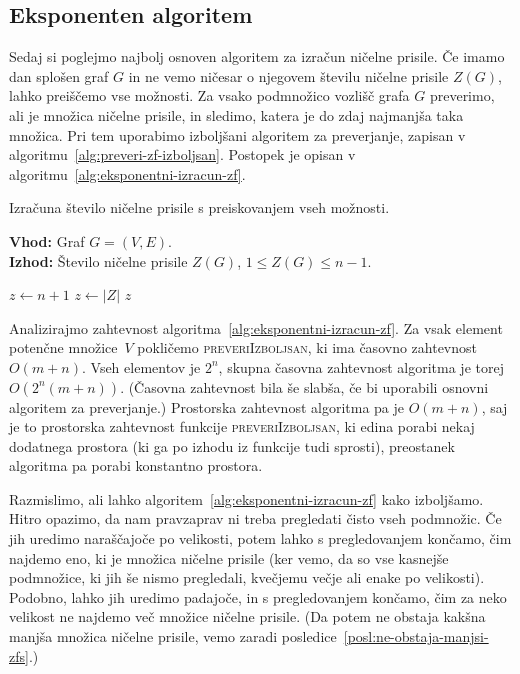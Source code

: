 \documentclass[12pt,a4paper,twoside]{article}
\theoremstyle{definition} %
\theoremstyle{plain} %
\numberwithin{equation}{section}  %
\begin{document}
\subsection{Eksponenten algoritem}
Sedaj si poglejmo najbolj osnoven algoritem za izračun ničelne prisile. Če imamo dan splošen graf $G$ in ne vemo ničesar o njegovem številu ničelne prisile $Z(G)$, lahko preiščemo vse možnosti. Za vsako podmnožico vozlišč grafa $G$ preverimo, ali je množica ničelne prisile, in sledimo, katera je do zdaj najmanjša taka množica. Pri tem uporabimo izboljšani algoritem za preverjanje, zapisan v algoritmu~\ref{alg:preveri-zf-izboljsan}. Postopek je opisan v algoritmu~\ref{alg:eksponentni-izracun-zf}.
\begin{algorithm}[!h]
    \caption{Izračuna število ničelne prisile s preiskovanjem vseh možnosti.}
    \label{alg:eksponentni-izracun-zf}
    \raggedright
    \textbf{Vhod:} Graf $G = (V,E)$. \\
    \textbf{Izhod:} Število ničelne prisile $Z(G)$, $1 \leq Z(G) \leq n-1$.
    \begin{algorithmic}[1]
        \State $z \gets n+1$
         
        \State $z \gets |Z|$
        \EndIf
        \EndFor
        \State \Return $z$
        \EndFunction
    \end{algorithmic}
\end{algorithm}

Analizirajmo zahtevnost algoritma~\ref{alg:eksponentni-izracun-zf}. Za vsak element potenčne množice~$V$ pokličemo \textsc{preveriIzboljsan}, ki ima časovno zahtevnost $O(m+n)$. Vseh elementov je $2^n$, skupna časovna zahtevnost algoritma je torej $O(2^n(m+n))$. (Časovna zahtevnost bila še slabša, če bi uporabili osnovni algoritem za preverjanje.)
Prostorska zahtevnost algoritma pa je $O(m+n)$, saj je to prostorska zahtevnost funkcije  \textsc{preveriIzboljsan}, ki edina porabi nekaj dodatnega prostora (ki ga po izhodu iz funkcije tudi sprosti), preostanek algoritma pa porabi konstantno prostora.

Razmislimo, ali lahko algoritem~\ref{alg:eksponentni-izracun-zf} kako izboljšamo. Hitro opazimo, da nam pravzaprav ni treba pregledati čisto vseh podmnožic. Če jih uredimo naraščajoče po velikosti, potem lahko s pregledovanjem končamo, čim najdemo eno, ki je množica ničelne prisile (ker vemo, da so vse kasnejše podmnožice, ki jih še nismo pregledali, kvečjemu večje ali enake po velikosti). Podobno, lahko jih uredimo padajoče, in s pregledovanjem končamo, čim za neko velikost ne najdemo več množice ničelne prisile. (Da potem ne obstaja kakšna manjša množica ničelne prisile, vemo zaradi posledice~\ref{posl:ne-obstaja-manjsi-zfs}.)
\end{document}
